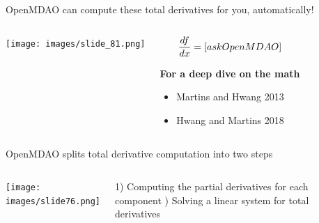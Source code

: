 \documentclass[aspectratio=169, usenames, dvipsnames, 14pt]{beamer}
\begin{document}

\begin{frame}{OpenMDAO can compute these total derivatives for you, automatically!}
\begin{columns}
        \texttt{[image: images/slide\_81.png]}
    
        \begin{center}

        \begin{equation*}
            \LARGE\frac{df}{dx} = [ask OpenMDAO]
        \end{equation*}
       
    \textbf{For a deep dive on the math}
            \begin{itemize}
                \item Martins and Hwang 2013
                \item Hwang and Martins 2018 
            \end{itemize}
        \end{center}
\end{columns}
    
\end{frame}



\begin{frame}{OpenMDAO splits total derivative computation into two steps}
\begin{columns}
        \texttt{[image: images/slide76.png]}
        
         1) Computing the partial derivatives for each component \newline {}) Solving a linear system for total derivatives
\end{columns}
    
\end{frame}

\end{document}
